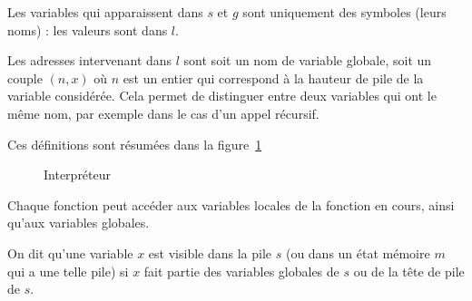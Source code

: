 Les variables qui apparaissent dans $s$ et $g$ sont uniquement des symboles
(leurs noms) : les valeurs sont dans $l$.

Les adresses intervenant dans $l$ sont soit un nom de variable globale, soit un
couple $(n, x)$ où $n$ est un entier qui correspond à la hauteur de pile de la
variable considérée. Cela permet de distinguer entre deux variables qui ont le
même nom, par exemple dans le cas d'un appel récursif.

Ces définitions sont résumées dans la figure~\ref{fig:interp}

\begin{figure}





  \caption{Interpréteur}
  \label{fig:interp}
\end{figure}

Chaque fonction peut accéder aux variables locales de la fonction en cours,
ainsi qu'aux variables globales.

\begin{definition}[Visibilité]
  On dit qu'une variable $x$ est visible dans la pile $s$ (ou dans un état
  mémoire $m$ qui a une telle pile) si $x$ fait partie des variables globales de
  $s$ ou de la tête de pile de $s$.
\end{definition}

